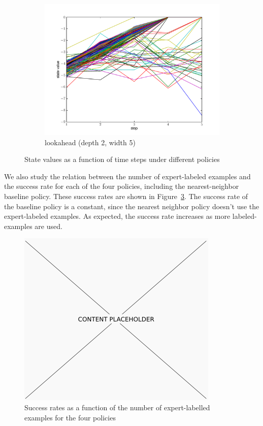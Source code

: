 \begin{figure}
\begin{subfigure}[b]{0.9\linewidth}
    \includegraphics[width=\textwidth]{figures/state_value_lookahead2-5.pdf}
    \caption{lookahead (depth 2, width 5)}
    \label{fig:value_lookahead_2}
  \end{subfigure}
  \caption{State values as a function of time steps under different policies}\label{fig:values}
\end{figure}



We also study the relation between the number of expert-labeled examples and the success rate for each of the four policies, including the nearest-neighbor baseline policy.
These success rates are shown in Figure~\ref{fig:number_examples}.
The success rate of the baseline policy is a constant, since the nearest neighbor policy doesn't use the expert-labeled examples.
As expected, the success rate increases as more labeled-examples are used.

\begin{figure}[h!]
  \centering
    \includegraphics[width=0.9\linewidth]{figures/placeholder.png}
  \caption{Success rates as a function of the number of expert-labelled examples for the four policies}
  \label{fig:number_examples}
\end{figure}

